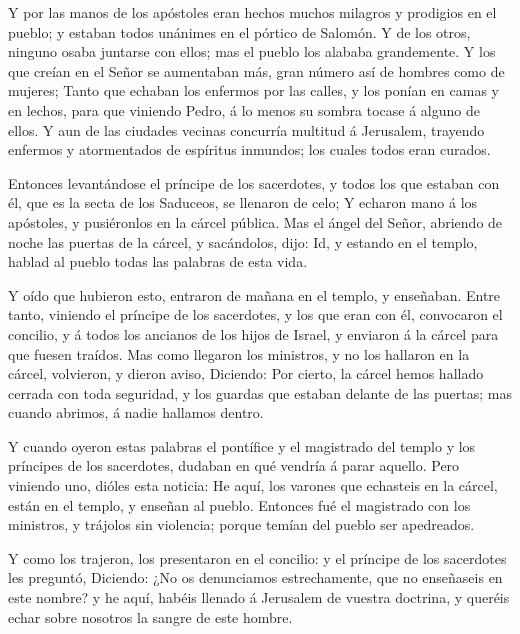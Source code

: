  Y por las manos de los apóstoles eran hechos muchos
milagros y prodigios en el pueblo; y estaban todos unánimes en el
pórtico de Salomón.  Y de los otros, ninguno osaba juntarse
con ellos; mas el pueblo los alababa grandemente.  Y los
que creían en el Señor se aumentaban más, gran número así de hombres
como de mujeres;  Tanto que echaban los enfermos por las
calles, y los ponían en camas y en lechos, para que viniendo Pedro, á lo
menos su sombra tocase á alguno de ellos.  Y aun de las
ciudades vecinas concurría multitud á Jerusalem, trayendo enfermos y
atormentados de espíritus inmundos; los cuales todos eran curados.

 Entonces levantándose el príncipe de los sacerdotes, y
todos los que estaban con él, que es la secta de los Saduceos, se
llenaron de celo;  Y echaron mano á los apóstoles, y
pusiéronlos en la cárcel pública.  Mas el ángel del Señor,
abriendo de noche las puertas de la cárcel, y sacándolos, dijo:
 Id, y estando en el templo, hablad al pueblo todas las
palabras de esta vida.

 Y oído que hubieron esto, entraron de mañana en el templo,
y enseñaban. Entre tanto, viniendo el príncipe de los sacerdotes, y los
que eran con él, convocaron el concilio, y á todos los ancianos de los
hijos de Israel, y enviaron á la cárcel para que fuesen traídos.
 Mas como llegaron los ministros, y no los hallaron en la
cárcel, volvieron, y dieron aviso,  Diciendo: Por cierto,
la cárcel hemos hallado cerrada con toda seguridad, y los guardas que
estaban delante de las puertas; mas cuando abrimos, á nadie hallamos
dentro.

 Y cuando oyeron estas palabras el pontífice y el
magistrado del templo y los príncipes de los sacerdotes, dudaban en qué
vendría á parar aquello.  Pero viniendo uno, dióles esta
noticia: He aquí, los varones que echasteis en la cárcel, están en el
templo, y enseñan al pueblo.  Entonces fué el magistrado
con los ministros, y trájolos sin violencia; porque temían del pueblo
ser apedreados.

 Y como los trajeron, los presentaron en el concilio: y el
príncipe de los sacerdotes les preguntó,  Diciendo: ¿No os
denunciamos estrechamente, que no enseñaseis en este nombre? y he aquí,
habéis llenado á Jerusalem de vuestra doctrina, y queréis echar sobre
nosotros la sangre de este hombre.

